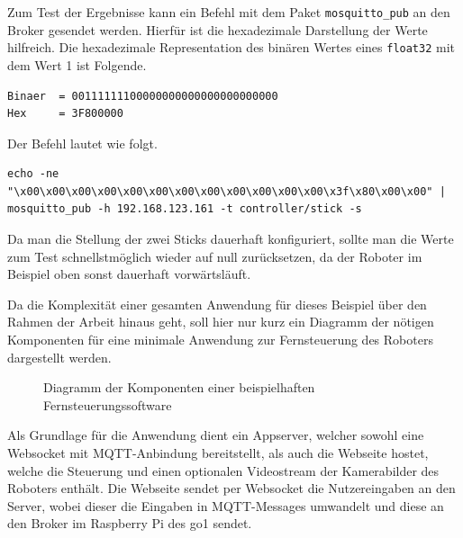 Zum Test der Ergebnisse kann ein Befehl mit dem Paket \texttt{mosquitto\_pub} an den Broker gesendet werden.
Hierfür ist die hexadezimale Darstellung der Werte hilfreich.
Die hexadezimale Representation des binären Wertes eines \texttt{float32} mit dem Wert \num{1} ist Folgende.

\begin{lstlisting}
Binaer  = 00111111100000000000000000000000
Hex     = 3F800000
\end{lstlisting}

\noindent Der Befehl lautet wie folgt.

\begin{lstlisting}
echo -ne "\x00\x00\x00\x00\x00\x00\x00\x00\x00\x00\x00\x00\x3f\x80\x00\x00" | mosquitto_pub -h 192.168.123.161 -t controller/stick -s
\end{lstlisting}

\noindent Da man die Stellung der zwei Sticks dauerhaft konfiguriert, sollte man die Werte zum Test schnellstmöglich
wieder auf null zurücksetzen, da der Roboter im Beispiel oben sonst dauerhaft vorwärtsläuft.


Da die Komplexität einer gesamten Anwendung für dieses Beispiel über den Rahmen der Arbeit hinaus geht, soll hier nur kurz
ein Diagramm der nötigen Komponenten für eine minimale Anwendung zur Fernsteuerung des Roboters dargestellt werden.

\begin{figure}[h]
    \caption{Diagramm der Komponenten einer beispielhaften Fernsteuerungssoftware}\label{fig:remote}
\end{figure}

\noindent Als Grundlage für die Anwendung dient ein Appserver, welcher sowohl eine Websocket mit MQTT-Anbindung bereitstellt,
als auch die Webseite hostet, welche die Steuerung und einen optionalen Videostream der Kamerabilder des Roboters enthält.
Die Webseite sendet per Websocket die Nutzereingaben an den Server, wobei dieser die Eingaben in MQTT-Messages umwandelt
und diese an den Broker im Raspberry Pi des \gls{go1} sendet.

